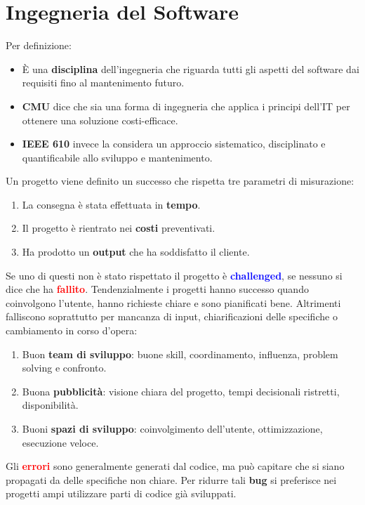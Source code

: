\chapter{Ingegneria del Software}
Per definizione:
\begin{itemize}
    \item È una \textbf{disciplina} dell'ingegneria che riguarda tutti gli aspetti del software dai requisiti fino al mantenimento futuro.
    \item \textbf{CMU} dice che sia una forma di ingegneria che applica i principi dell'IT per ottenere una soluzione costi-efficace.
    \item \textbf{IEEE 610} invece la considera un approccio sistematico, disciplinato e quantificabile allo sviluppo e mantenimento.
\end{itemize}
Un progetto viene definito un successo che rispetta tre parametri di misurazione:
\begin{enumerate}
    \item La consegna è stata effettuata in \textbf{tempo}.
    \item Il progetto è rientrato nei \textbf{costi} preventivati.
    \item Ha prodotto un \textbf{output} che ha soddisfatto il cliente.
\end{enumerate}
Se uno di questi non è stato rispettato il progetto è \textbf{\textcolor{blue}{challenged}}, se nessuno si dice che ha \textbf{\textcolor{red}{fallito}}.
Tendenzialmente i progetti hanno successo quando coinvolgono l'utente, hanno richieste chiare e sono pianificati bene.
Altrimenti falliscono soprattutto per mancanza di input, chiarificazioni delle specifiche o cambiamento in corso d'opera:
\begin{enumerate}
    \item Buon \textbf{team di sviluppo}: buone skill, coordinamento, influenza, problem solving e confronto.
    \item Buona \textbf{pubblicità}: visione chiara del progetto, tempi decisionali ristretti, disponibilità.
    \item Buoni \textbf{spazi di sviluppo}: coinvolgimento dell'utente, ottimizzazione, esecuzione veloce.
\end{enumerate}

Gli \textbf{\textcolor{red}{errori}} sono generalmente generati dal codice, ma può capitare che si siano propagati da delle specifiche non chiare. Per ridurre tali \textbf{bug} si preferisce nei progetti ampi utilizzare parti di codice già sviluppati. \\

